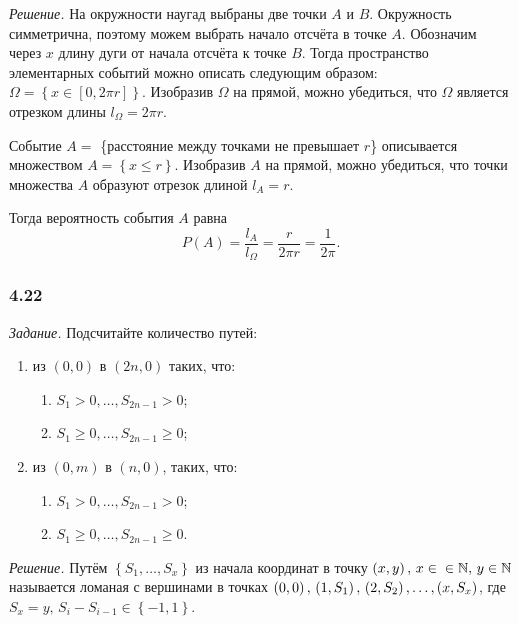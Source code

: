 \textit{Решение.} На окружности наугад выбраны две точки $A$ и $B$.
Окружность симметрична, поэтому можем выбрать начало отсчёта в точке $A$.
Обозначим через $x$ длину дуги от начала отсчёта к точке $B$.
Тогда пространство элементарных событий можно описать следующим образом:
$ \Omega =
\left\{ x \in \left[ 0, 2 \pi r \right] \right\} $.
Изобразив $ \Omega $ на прямой, можно убедиться, что $ \Omega $ является отрезком длины $l_{ \Omega } = 2 \pi r$.

Событие $A = $ \{расстояние между точками не превышает $r$\} описывается множеством $A = \left\{ x \leq r \right\} $.
Изобразив $A$ на прямой, можно убедиться, что точки множества $A$ образуют отрезок длиной $l_A = r$.

Тогда вероятность события $A$ равна
$$P \left( A \right) =
\frac{l_A}{l_{ \Omega }} =
\frac{r}{2 \pi r} =
\frac{1}{2 \pi}.$$

\subsubsection*{4.22}

\textit{Задание.} Подсчитайте количество путей:
\begin{enumerate}[label=\alph*)]
\item из $ \left( 0, 0 \right) $ в $ \left( 2n, 0 \right) $ таких, что:
\begin{enumerate}[label=(\roman*)]
\item $S_1 > 0, \dotsc, S_{2n-1} > 0$;
\item $S_1 \geq 0, \dotsc, S_{2n-1} \geq 0$;
\end{enumerate}

\item из $ \left( 0, m \right) $ в $ \left( n, 0 \right) $, таких, что:
\begin{enumerate}[label=(\roman*)]
\item $S_1 > 0, \dotsc, S_{2n-1} > 0$;
\item $S_1 \geq 0, \dotsc, S_{2n-1} \geq 0$.
\end{enumerate}
\end{enumerate}

\textit{Решение.} Путём $ \left\{ S_1, \dotsc, S_x \right\} $ из начала координат в точку
$ \left( x, y \right), \, x \in \\ \in \mathbb{N}, \, y \in \mathbb{N} $
называется ломаная с вершинами в точках
$ \left( 0, 0 \right), \, \left( 1, S_1 \right), \\ \left( 2, S_2 \right), \dotsc, \left( x, S_x \right) $, где $S_x = y, \, S_i - S_{i-1} \in \left\{ -1, 1 \right\} .$

